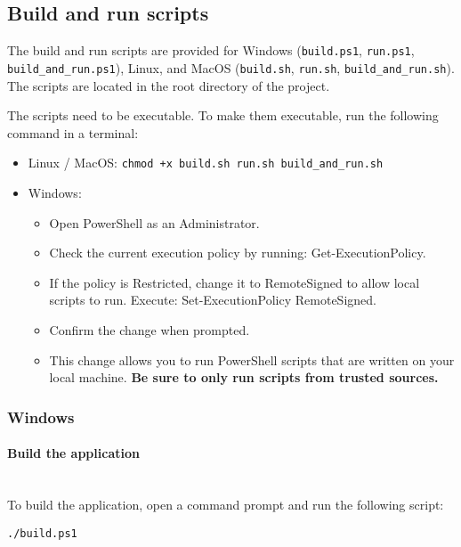 \subsection{Build and run scripts}

The build and run scripts are provided for Windows (\texttt{build.ps1}, \texttt{run.ps1}, \texttt{build\_and\_run.ps1}), Linux, and
MacOS (\texttt{build.sh}, \texttt{run.sh}, \texttt{build\_and\_run.sh}). The scripts are located in the root directory of the project.

\begin{bfhWarnBox}
	The scripts need to be executable. To make them executable, run the following command in a terminal:
	\begin{itemize}
		\item Linux / MacOS: \texttt{chmod +x build.sh run.sh build\_and\_run.sh}
		\item Windows: 
		\begin{itemize}
			\item Open PowerShell as an Administrator. 
			\item Check the current execution policy by running: Get-ExecutionPolicy. 
			\item If the policy is Restricted, change it to RemoteSigned to allow local scripts to run. Execute: Set-ExecutionPolicy RemoteSigned. 
			\item Confirm the change when prompted.
			\item This change allows you to run PowerShell scripts that are written on your local machine. \textbf{Be sure to only run scripts from trusted sources.}
		\end{itemize}
	\end{itemize}
\end{bfhWarnBox}

\subsubsection{Windows}

\paragraph{Build the application}
\mbox{}\\
To build the application, open a command prompt and run the following script:

\begin{lstlisting}[numbers=none, caption={Script to Build the URL-Archiver Application on Windows}, label={lst:build_win}]
./build.ps1
\end{lstlisting}


